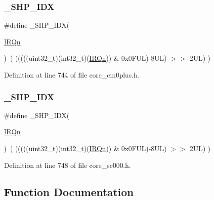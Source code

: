\subsubsection{\texorpdfstring{\+\_\+\+S\+H\+P\+\_\+\+I\+DX}{\_SHP\_IDX}\hspace{0.1cm}{\footnotesize\ttfamily [2/3]}}
{\footnotesize\ttfamily \#define \+\_\+\+S\+H\+P\+\_\+\+I\+DX(\begin{DoxyParamCaption}\item[{}]{\hyperlink{group___configuration__section__for___c_m_s_i_s_ga666eb0caeb12ec0e281415592ae89083}{I\+R\+Qn} }\end{DoxyParamCaption})~( (((((uint32\+\_\+t)(int32\+\_\+t)(\hyperlink{group___configuration__section__for___c_m_s_i_s_ga666eb0caeb12ec0e281415592ae89083}{I\+R\+Qn})) \& 0x0\+F\+U\+L)-\/8\+U\+L) $>$$>$    2\+U\+L)      )}



Definition at line 744 of file core\+\_\+cm0plus.\+h.

\mbox{\label{group___c_m_s_i_s___core___n_v_i_c_functions_gaee4f7eb5d7e770ad51489dbceabb1755}} 
\subsubsection{\texorpdfstring{\+\_\+\+S\+H\+P\+\_\+\+I\+DX}{\_SHP\_IDX}\hspace{0.1cm}{\footnotesize\ttfamily [3/3]}}
{\footnotesize\ttfamily \#define \+\_\+\+S\+H\+P\+\_\+\+I\+DX(\begin{DoxyParamCaption}\item[{}]{\hyperlink{group___configuration__section__for___c_m_s_i_s_ga666eb0caeb12ec0e281415592ae89083}{I\+R\+Qn} }\end{DoxyParamCaption})~( (((((uint32\+\_\+t)(int32\+\_\+t)(\hyperlink{group___configuration__section__for___c_m_s_i_s_ga666eb0caeb12ec0e281415592ae89083}{I\+R\+Qn})) \& 0x0\+F\+U\+L)-\/8\+U\+L) $>$$>$    2\+U\+L)      )}



Definition at line 748 of file core\+\_\+sc000.\+h.



\subsection{Function Documentation}
\mbox{\label{group___c_m_s_i_s___core___n_v_i_c_functions_ga332e10ef9605dc6eb10b9e14511930f8}} 
